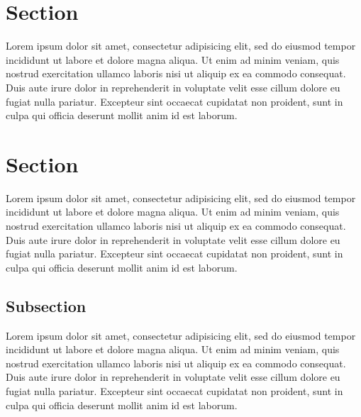 \documentclass[a5paper, 10pt]{book}
\newcommand*\circled[1]{\tikz[baseline=(char.base)]{
            \node[shape=circle,draw,inner sep=0.2pt] (char) {#1};}}
\newcounter{mn}
\newcommand{\mnote}[1]{\refstepcounter{mn}\textsuperscript{\fontsize{6pt}{6pt}\selectfont\circled{\arabic{mn}}}\marginpar{\raggedright\fontsize{8pt}{8pt}\selectfont \textbf{\arabic{mn}:} \textcolor{contrast}{#1}}}
\begin{document}
	\section{Section}

	Lorem ipsum dolor sit amet, consectetur adipisicing elit, sed do eiusmod tempor incididunt ut labore et dolore magna aliqua. Ut enim ad minim veniam, quis nostrud exercitation ullamco laboris nisi ut aliquip ex ea commodo\mnote{Hallo hier ist eine Randnote ! Lorem ipsum dolor sit amet, consectetur adipisicing elit, sed do eiusmod tempor incididunt ut labore et dolore magna aliqua. Ut enim ad minim veniam, quis nostrud exercitation ullamco laboris nisi ut aliquip ex ea commodo consequat. Duis aute irure dolor in reprehenderit in voluptate velit esse cillum dolore eu fugiat nulla pariatur. Excepteur sint occaecat cupidatat non proident, sunt in culpa qui officia deserunt mollit anim id est laborum.} consequat. Duis aute irure dolor in reprehenderit in voluptate velit esse cillum dolore eu fugiat nulla pariatur. Excepteur sint occaecat cupidatat non proident, sunt in culpa qui officia deserunt mollit anim id est laborum.

	\section{Section}

	Lorem ipsum dolor sit amet, consectetur adipisicing elit, sed do eiusmod tempor incididunt ut labore et dolore magna aliqua. Ut enim ad minim veniam, quis nostrud exercitation ullamco laboris nisi ut aliquip ex ea commodo consequat. Duis aute irure dolor in reprehenderit in voluptate velit esse cillum dolore eu fugiat nulla pariatur. Excepteur sint occaecat cupidatat non proident, sunt in culpa qui officia deserunt mollit anim id est laborum.

	\subsection{Subsection}

	Lorem ipsum dolor sit amet, consectetur adipisicing elit, sed do eiusmod tempor incididunt ut labore et dolore magna aliqua. Ut enim ad minim veniam, quis nostrud exercitation ullamco laboris nisi ut aliquip ex ea commodo consequat. Duis aute irure dolor in reprehenderit in voluptate velit esse cillum dolore eu fugiat nulla pariatur. Excepteur sint occaecat cupidatat non proident, sunt in culpa qui officia deserunt mollit anim id est laborum.
\end{document}

